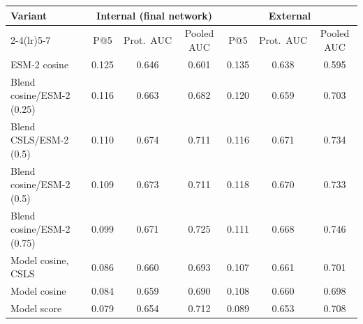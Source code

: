 \begin{tabular}{lcccccc}
\toprule
Variant & \multicolumn{3}{c}{Internal (final network)} & \multicolumn{3}{c}{External} \\
\cmidrule(lr){2-4}\cmidrule(lr){5-7}
 & P@5 & Prot.\ AUC & Pooled AUC & P@5 & Prot.\ AUC & Pooled AUC \\
\midrule
ESM-2 cosine & 0.125 & 0.646 & 0.601 & 0.135 & 0.638 & 0.595 \\
Blend cosine/ESM-2 (0.25) & 0.116 & 0.663 & 0.682 & 0.120 & 0.659 & 0.703 \\
Blend CSLS/ESM-2 (0.5) & 0.110 & 0.674 & 0.711 & 0.116 & 0.671 & 0.734 \\
Blend cosine/ESM-2 (0.5) & 0.109 & 0.673 & 0.711 & 0.118 & 0.670 & 0.733 \\
Blend cosine/ESM-2 (0.75) & 0.099 & 0.671 & 0.725 & 0.111 & 0.668 & 0.746 \\
Model cosine, CSLS & 0.086 & 0.660 & 0.693 & 0.107 & 0.661 & 0.701 \\
Model cosine & 0.084 & 0.659 & 0.690 & 0.108 & 0.660 & 0.698 \\
Model score & 0.079 & 0.654 & 0.712 & 0.089 & 0.653 & 0.708 \\
\bottomrule
\end{tabular}
